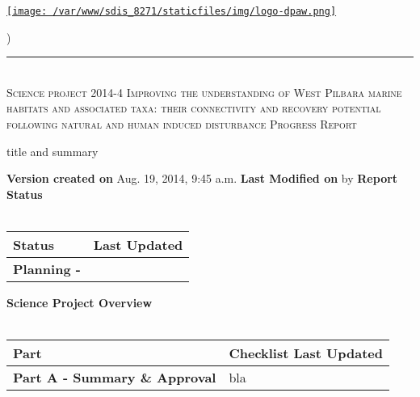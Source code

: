 \documentclass[version=last, paper=a4, DIV=18, usenames, dvipsnames]{scrartcl}
\newcommand{\HRule}{\rule{\linewidth}{0.1pt}}
\begin{document}
\setcounter{secnumdepth}{-1}


\begin{titlepage}
\begin{center}
\begin{minipage}[t]{0.28\textwidth}
\begin{flushleft}
\href{http://www.dpaw.wa.gov.au}{\texttt{[image: /var/www/sdis\_8271/staticfiles/img/logo-dpaw.png]}}
\end{flushleft}
\end{minipage}
\begin{minipage}[b]{0.7\textwidth}
\begin{flushright}
    \href{http://sdis.dpaw.wa.gov.au/documents/progressreport/1280/download/tex/}{}) \\
\end{flushright}
\end{minipage}
\HRule \\[0.4cm]
\vfill
\textsc{\Huge Science project 2014-4 Improving the understanding of West Pilbara marine habitats and associated taxa: their connectivity and recovery potential following natural and human induced disturbance \newline }
\vfill
\textsc{\Huge Progress Report}

\vfill\vfill\vfill\vfill
title and summary

\vfill\vfill\vfill\vfill\vfill\vfill\vfill\vfill

\textbf{Version created on} Aug. 19, 2014, 9:45 a.m.
\vfill
\textbf{Last Modified on}  by 
\vfill\vfill
\textbf{Report Status}\\\,
\begin{tabu} to \linewidth { | X[l] | X | }
\hline
{}
Status & Last Updated \\
\hline
\textbf{Planning - } \\
\hline
\end{tabu}
\vfill
\textbf{Science Project Overview}\\\,
\begin{tabu} to \linewidth { | X[l] | X | }
\hline
{}
Part & Checklist Last Updated \\
\hline
\textbf{Part A - Summary \& Approval} & bla \\
\hline
\end{tabu}

\end{center}
\end{titlepage}
\end{document}
